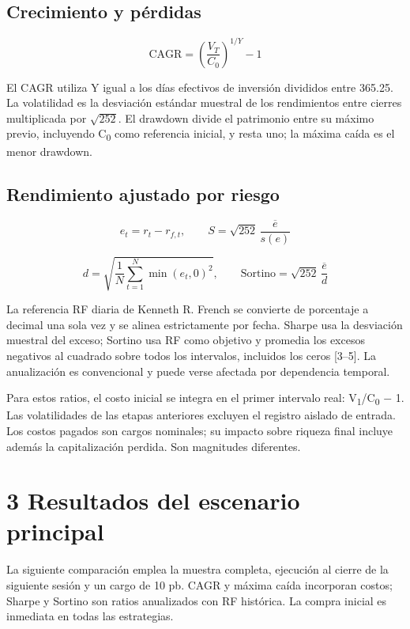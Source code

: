 \documentclass[11pt,letterpaper]{article}
\begin{document}
\subsection*{Crecimiento y pérdidas}

\[
\mathrm{CAGR}=\left(\frac{V_T}{C_0}\right)^{1/Y}-1
\]

El CAGR utiliza Y igual a los días efectivos de inversión divididos entre 365.25. La volatilidad es la desviación estándar muestral de los rendimientos entre cierres multiplicada por \(\sqrt{252}\). El drawdown divide el patrimonio entre su máximo previo, incluyendo C\textsubscript{0} como referencia inicial, y resta uno; la máxima caída es el menor drawdown.

\subsection*{Rendimiento ajustado por riesgo}

\[
e_t=r_t-r_{f,t},\qquad S=\sqrt{252}\,\frac{\overline e}{s(e)}
\]

\[
d=\sqrt{\frac{1}{N}\sum_{t=1}^{N}\min(e_t,0)^2},\qquad\mathrm{Sortino}=\sqrt{252}\,\frac{\overline e}{d}
\]

La referencia RF diaria de Kenneth R. French se convierte de porcentaje a decimal una sola vez y se alinea estrictamente por fecha. Sharpe usa la desviación muestral del exceso; Sortino usa RF como objetivo y promedia los excesos negativos al cuadrado sobre todos los intervalos, incluidos los ceros [3--5]. La anualización es convencional y puede verse afectada por dependencia temporal.

Para estos ratios, el costo inicial se integra en el primer intervalo real: V\textsubscript{1}/C\textsubscript{0} \ensuremath{-} 1. Las volatilidades de las etapas anteriores excluyen el registro aislado de entrada. Los costos pagados son cargos nominales; su impacto sobre riqueza final incluye además la capitalización perdida. Son magnitudes diferentes.


\clearpage

\section*{3 Resultados del escenario principal}

La siguiente comparación emplea la muestra completa, ejecución al cierre de la siguiente sesión y un cargo de 10 pb. CAGR y máxima caída incorporan costos; Sharpe y Sortino son ratios anualizados con RF histórica. La compra inicial es inmediata en todas las estrategias.
\end{document}
